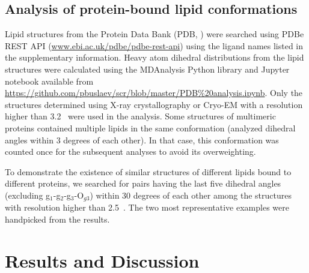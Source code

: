 \documentclass[aps,prl,superscriptaddress,twocolumn]{revtex4}
\begin{document}
\subsection{Analysis of protein-bound lipid conformations}
Lipid structures from the Protein Data Bank (PDB, \cite{berman2000})
were searched using PDBe REST API (\url{www.ebi.ac.uk/pdbe/pdbe-rest-api})
using the ligand names listed in the supplementary information.
Heavy atom dihedral distributions from the lipid structures were calculated
using the MDAnalysis Python library \cite{agrawal11,gowers16} and
Jupyter notebook available from \url{https://github.com/pbuslaev/scr/blob/master/PDB%20analysis.ipynb}.
Only the structures determined using X-ray crystallography or Cryo-EM with a resolution higher than 3.2~\text{\AA} were used in the analysis. Some structures of multimeric proteins contained multiple lipids in the same conformation (analyzed dihedral angles within 3 degrees of each other). In that case, this conformation was counted once for the subsequent analyses
to avoid its overweighting.
  
To demonstrate the existence of similar structures of different lipids bound to different proteins,
we searched for pairs having the last five dihedral angles (excluding g$_1$-g$_2$-g$_3$-O$_{g3}$) within
30 degrees of each other among the structures with resolution higher than 2.5~\text{\AA}. The two most representative examples
were handpicked from the results.


\section{Results and Discussion}
\end{document}
